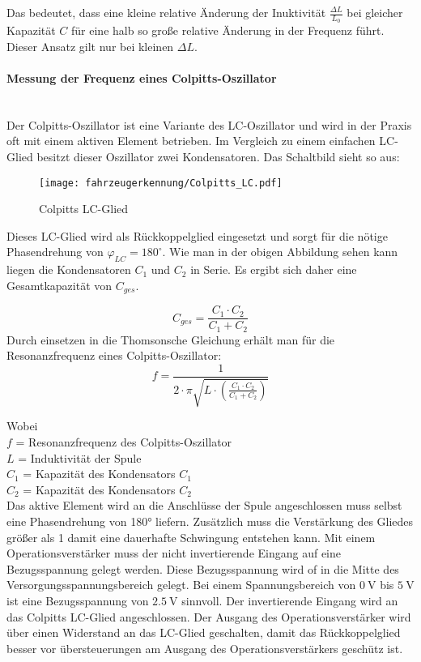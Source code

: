 Das bedeutet, dass eine kleine relative Änderung der Inuktivität $\frac{\Delta L}{L_{0}}$ bei gleicher Kapazität $C$ für eine halb so große relative Änderung in der Frequenz führt. 
Dieser Ansatz gilt nur bei kleinen $\Delta L$.

\paragraph{Messung der Frequenz eines Colpitts-Oszillator}\mbox{}\\

Der Colpitts-Oszillator ist eine Variante des LC-Oszillator und wird in der Praxis oft mit einem aktiven Element betrieben. Im Vergleich zu einem einfachen LC-Glied besitzt dieser Oszillator
zwei Kondensatoren. Das Schaltbild sieht so aus:

\begin{figure}[H]
    \centering
    \texttt{[image: fahrzeugerkennung/Colpitts\_LC.pdf]}
    \caption{Colpitts LC-Glied}
\end{figure}

Dieses LC-Glied wird als Rückkoppelglied eingesetzt und sorgt für die nötige Phasendrehung von $\varphi_{LC} = 180^{\circ}$. Wie man in der obigen Abbildung sehen kann liegen die Kondensatoren 
$C_{1}$ und $C_{2}$ in Serie. Es ergibt sich daher eine Gesamtkapazität von $C_{ges}$.

\begin{equation} \label{eq:c_gescolpitts}
    C_{ges} = \frac{C_{1} \cdot C_{2}}{C_{1} + C_{2}}
\end{equation}
Durch einsetzen in die Thomsonsche Gleichung erhält man für die Resonanzfrequenz eines Colpitts-Oszillator:
\begin{equation} \label{eq:colpitts}
    f = \frac{1}{2 \cdot \pi \sqrt{L \cdot \left( \frac{C_{1} \cdot C_{2}}{C_{1} + C_{2}} \right) }}
\end{equation}

Wobei \\
$f$ = Resonanzfrequenz des Colpitts-Oszillator\\
$L$ = Induktivität der Spule\\
$C_{1}$ = Kapazität des Kondensators $C_{1}$\\
$C_{2}$ = Kapazität des Kondensators $C_{2}$\\

\pagebreak
Das aktive Element wird an die Anschlüsse der Spule angeschlossen muss selbst eine Phasendrehung von 180° liefern. Zusätzlich muss die Verstärkung des Gliedes größer als 1 damit eine dauerhafte 
Schwingung entstehen kann. Mit einem Operationsverstärker muss der nicht invertierende Eingang auf eine Bezugsspannung gelegt werden. Diese Bezugsspannung wird of in die Mitte des Versorgungsspannungsbereich
gelegt. Bei einem Spannungsbereich von $\SI{0}{\volt}$ bis $\SI{5}{\volt}$ ist eine Bezugsspannung von $\SI{2,5}{\volt}$ sinnvoll. Der invertierende Eingang wird an das Colpitts LC-Glied angeschlossen. Der Ausgang des Operationsverstärker wird über
einen Widerstand an das LC-Glied geschalten, damit das Rückkoppelglied besser vor übersteuerungen am Ausgang des Operationsverstärkers geschütz ist. 


